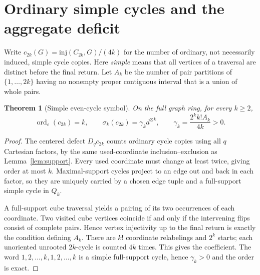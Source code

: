 \documentclass[11pt]{amsart}
\DeclareMathOperator{\ord}{ord}
\newcommand{\eps}{\varepsilon}
\newtheorem{theorem}{Theorem}[section]
\theoremstyle{definition}
\theoremstyle{remark}
\begin{document}
\section{Ordinary simple cycles and the aggregate deficit}
Write $c_{2k}(G)=\mathrm{inj}(C_{2k},G)/(4k)$ for the number of
ordinary, not necessarily induced, simple cycle copies. Here
\emph{simple} means that all vertices of a traversal are distinct before
the final return. Let $A_k$ be the number of pair partitions of
$\{1,\ldots,2k\}$ having no nonempty proper contiguous interval
that is a union of whole pairs.

\begin{theorem}[Simple even-cycle symbol]\label{thm:cycles}
On the full graph ring, for every $k\ge2$,
\[
\ord_\eps(c_{2k})=k,\qquad
\sigma_k(c_{2k})=\gamma_k d^{\otimes k},\qquad
\gamma_k=\frac{2^k k! A_k}{4k}>0.
\]
\end{theorem}
\begin{proof}
The centered defect $D_q c_{2k}$ counts ordinary cycle copies using
all $q$ Cartesian factors, by the same used-coordinate inclusion--exclusion
as Lemma~\ref{lem:support}. Every used coordinate must change at least
twice, giving order at most $k$. Maximal-support cycles project to an
edge out and back in each factor, so they are uniquely carried by a
chosen edge tuple and a full-support simple cycle in $Q_k$.

A full-support cube traversal yields a pairing of its two occurrences
of each coordinate. Two visited cube vertices coincide if and only if
the intervening flips consist of complete pairs. Hence vertex
injectivity up to the final return is exactly the condition defining
$A_k$. There are $k!$ coordinate relabelings and $2^k$ starts; each
unoriented unrooted $2k$-cycle is counted $4k$ times. This gives the
coefficient. The word $1,2,\ldots,k,1,2,\ldots,k$ is a simple
full-support cycle, hence $\gamma_k>0$ and the order is exact.
\end{proof}
\end{document}
